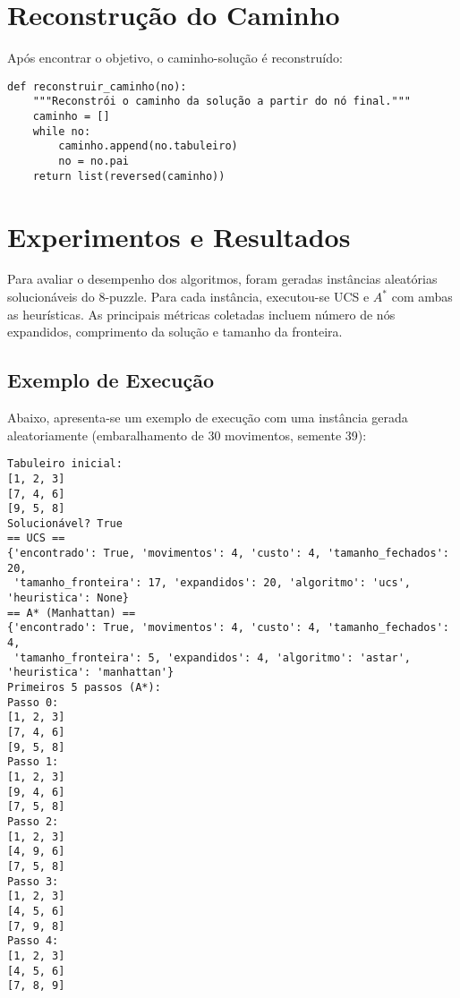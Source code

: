 \section{Reconstrução do Caminho}  
Após encontrar o objetivo, o caminho-solução é reconstruído:  
\begin{verbatim}  
def reconstruir_caminho(no):  
    """Reconstrói o caminho da solução a partir do nó final."""  
    caminho = []  
    while no:  
        caminho.append(no.tabuleiro)  
        no = no.pai  
    return list(reversed(caminho))  
\end{verbatim}  
  
\section{Experimentos e Resultados}  
Para avaliar o desempenho dos algoritmos, foram geradas instâncias aleatórias solucionáveis do 8-puzzle. Para cada instância, executou-se UCS e $A^*$ com ambas as heurísticas. As principais métricas coletadas incluem número de nós expandidos, comprimento da solução e tamanho da fronteira.  
  
\subsection{Exemplo de Execução}  
Abaixo, apresenta-se um exemplo de execução com uma instância gerada aleatoriamente (embaralhamento de 30 movimentos, semente 39):  
\begin{verbatim}  
Tabuleiro inicial:  
[1, 2, 3]  
[7, 4, 6]  
[9, 5, 8]  
Solucionável? True  
== UCS ==  
{'encontrado': True, 'movimentos': 4, 'custo': 4, 'tamanho_fechados': 20,  
 'tamanho_fronteira': 17, 'expandidos': 20, 'algoritmo': 'ucs', 'heuristica': None}  
== A* (Manhattan) ==  
{'encontrado': True, 'movimentos': 4, 'custo': 4, 'tamanho_fechados': 4,  
 'tamanho_fronteira': 5, 'expandidos': 4, 'algoritmo': 'astar', 'heuristica': 'manhattan'}  
Primeiros 5 passos (A*):  
Passo 0:  
[1, 2, 3]  
[7, 4, 6]  
[9, 5, 8]  
Passo 1:  
[1, 2, 3]  
[9, 4, 6]  
[7, 5, 8]  
Passo 2:  
[1, 2, 3]  
[4, 9, 6]  
[7, 5, 8]  
Passo 3:  
[1, 2, 3]  
[4, 5, 6]  
[7, 9, 8]  
Passo 4:  
[1, 2, 3]  
[4, 5, 6]  
[7, 8, 9]  
\end{verbatim}  
  
